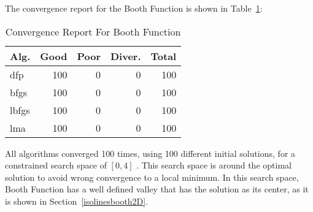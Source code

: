 
The convergence report for the Booth Function is shown in Table~\ref{convergence:booth}:

\begin{table}[H]
\centering
\caption{Convergence Report For Booth Function}
\label{convergence:booth}
\begin{tabular}{lrrrr}
\toprule
 Alg. &  Good &  Poor &  Diver. &  Total \\
\midrule
  dfp &   100 &     0 &       0 &    100 \\
 bfgs &   100 &     0 &       0 &    100 \\
lbfgs &   100 &     0 &       0 &    100 \\
  lma &   100 &     0 &       0 &    100 \\
\bottomrule
\end{tabular}
\end{table}

All algorithms converged 100 times, using 100 different initial solutions,
for a constrained search space of $\left[0, 4\right]$ . This search space is around
the optimal solution to avoid wrong convergence to a local minimum. In this search space,
Booth Function has a well defined valley that has the solution as its center, as it is shown
in Section~\ref{isolinesbooth2D}.
